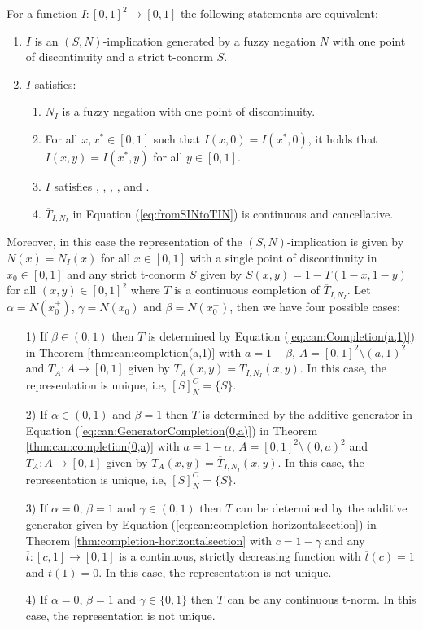 \begin{proposition}\label{prop:characterization(S,N)_strict}
	For a function $I:[0,1]^2 \to [0,1]$ the following statements are equivalent:
	\begin{enumerate}[label=(\roman*)]
		\item $I$ is an $(S,N)$-implication  generated by a fuzzy negation $N$ with one point of discontinuity and a strict t-conorm $S$.
		\item $I$ satisfies:
		\begin{enumerate}
			\item $N_I$ is a fuzzy negation with one point of discontinuity.
			\item For all $x,x^*\in[0,1]$ such that $I(x,0)=I(x^*,0)$, it holds that $I(x,y)=I(x^*,y)$ for all $y\in[0,1]$.
			\item $I$ satisfies \Ione, \Itwo, \NP, \EP, \Rone and \Rtwo.
			\item $\overline{T}_{I,N_I}$ in Equation (\ref{eq:fromSINtoTIN}) is continuous and cancellative.
		\end{enumerate}
	\end{enumerate}
	Moreover, in this case the representation of the $(S,N)$-implication is given by $N(x)=N_I(x)$ for all $x \in [0,1]$ with a single point of discontinuity in $x_0 \in [0,1]$ and any strict t-conorm $S$ given by $S(x,y)=1-T(1-x,1-y)$ for all $(x,y) \in [0,1]^2$ where $T$ is a continuous completion of $\overline{T}_{I,N_I}$. Let  $\alpha=N(x_0^{+})$, $\gamma=N(x_0)$ and $\beta=N(x_0^{-})$, then we have four possible cases:
	\begin{enumerate}
		\item[1)] If $\beta \in(0,1)$ then $T$ is determined by Equation (\ref{eq:can:Completion(a,1)}) in Theorem \ref{thm:can:completion(a,1)} with $a=1-\beta$, $A=[0,1]^2 \setminus (a,1)^2$ and $T_A : A \to [0,1]$ given by $T_A(x,y)=\overline{T}_{I,N_I}(x,y)$. In this case, the representation is unique, i.e, $[S]_N^C=\{S\}$.
		\item[2)] If $\alpha \in (0,1)$ and $\beta=1$ then $T$ is determined by the additive generator in Equation (\ref{eq:can:GeneratorCompletion(0,a)}) in Theorem \ref{thm:can:completion(0,a)} with $a=1-\alpha$, $A=[0,1]^2 \setminus (0,a)^2$ and $T_A : A \to [0,1]$ given by $T_A(x,y)=\overline{T}_{I,N_I}(x,y)$. In this case, the representation is unique, i.e, $[S]_N^C=\{S\}$.
		\item[3)] If $\alpha=0$, $\beta=1$ and $\gamma \in (0,1)$ then $T$ can be determined by the additive generator given by Equation (\ref{eq:can:completion-horizontalsection}) in Theorem \ref{thm:completion-horizontalsection} with $c=1-\gamma$ and any $\overline{t}:[c,1] \to [0,1]$ is a continuous, strictly decreasing function with $\overline{t}(c)=1$ and $t(1)=0$. In this case, the representation is not unique.
		\item[4)] If $\alpha=0$, $\beta=1$ and $\gamma \in \{0,1\}$ then $T$ can be  any continuous t-norm. In this case, the representation is not unique.
	\end{enumerate}
\end{proposition}

